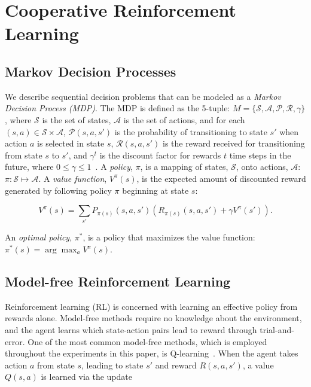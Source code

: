\documentclass[letterpaper]{article}
\begin{document}
\section{Cooperative Reinforcement Learning}

\subsection{Markov Decision Processes}

We describe sequential decision problems that can be modeled as a \textit{Markov Decision Process (MDP)}. The MDP is defined as the 5-tuple: $M=\{\mathcal{S},\mathcal{A},\mathcal{P},\mathcal{R},\gamma\}$, where $\mathcal{S}$ is the set of states, $\mathcal{A}$ is the set of actions, and for each $(s,a) \in \mathcal{S} \times \mathcal{A}$, $\mathcal{P}(s,a,s')$ is the probability of transitioning to state $s'$ when action $a$ is selected in state $s$, $\mathcal{R}(s,a,s')$ is the reward received for transitioning from state $s$ to $s'$, and $\gamma^t$ is the discount factor for rewards $t$ time steps in the future, where $0\leq\gamma\leq1$~\cite{sutton1998reinforcement}. A \textit{policy}, $\pi$, is a mapping of states, $\mathcal{S}$, onto actions, $\mathcal{A}$: $\pi:\mathcal{S}\mapsto\mathcal{A}$. A \textit{value function}, $V^{\pi}(s)$, is the expected amount of discounted reward generated by following policy $\pi$ beginning at state $s$:

\begin{equation} 
V^{\pi}(s) = \sum\limits_{s'} P_{\pi(s)}(s,a,s')(R_{\pi(s)}(s,a,s')+\gamma V^{\pi}(s')).
\end{equation}

\noindent
An \textit{optimal policy}, $\pi^{*}$, is a policy that maximizes the value function: $\pi^{*}(s) = \arg\max_a V^{\pi}(s)$.

\subsection{Model-free Reinforcement Learning}

Reinforcement learning (RL) is concerned with learning an effective policy from rewards alone. Model-free methods require no knowledge about the environment, and the agent learns which state-action pairs lead to reward through trial-and-error. One of the most common model-free methods, which is employed throughout the experiments in this paper, is Q-learning~\cite{sutton1998reinforcement}. When the agent takes action $a$ from state $s$, leading to state $s'$ and reward $R(s,a,s')$, a value $Q(s,a)$ is learned via the update
\end{document}
